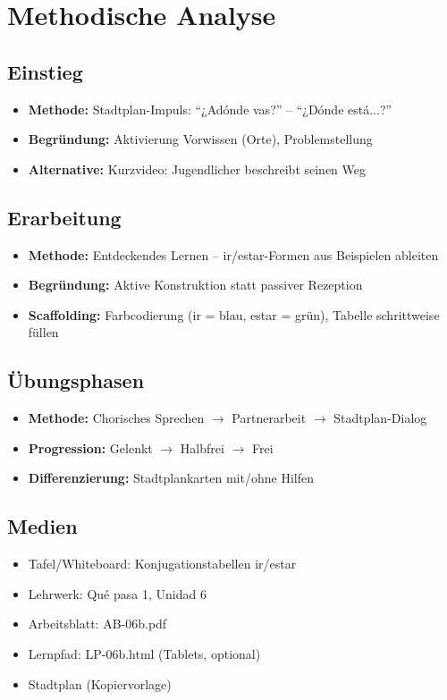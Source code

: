 \documentclass[11pt,a4paper]{article}
\newcommand{\lehrwerk}{Qué pasa 1}
\newcommand{\lehrwerkseite}{Unidad 6}
\begin{document}
\section{Methodische Analyse}

\subsection{Einstieg}
\begin{itemize}
    \item \textbf{Methode:} Stadtplan-Impuls: ``¿Adónde vas?'' -- ``¿Dónde está...?''
    \item \textbf{Begründung:} Aktivierung Vorwissen (Orte), Problemstellung
    \item \textbf{Alternative:} Kurzvideo: Jugendlicher beschreibt seinen Weg
\end{itemize}

\subsection{Erarbeitung}
\begin{itemize}
    \item \textbf{Methode:} Entdeckendes Lernen -- ir/estar-Formen aus Beispielen ableiten
    \item \textbf{Begründung:} Aktive Konstruktion statt passiver Rezeption
    \item \textbf{Scaffolding:} Farbcodierung (ir = blau, estar = grün), Tabelle schrittweise füllen
\end{itemize}

\subsection{Übungsphasen}
\begin{itemize}
    \item \textbf{Methode:} Chorisches Sprechen $\rightarrow$ Partnerarbeit $\rightarrow$ Stadtplan-Dialog
    \item \textbf{Progression:} Gelenkt $\rightarrow$ Halbfrei $\rightarrow$ Frei
    \item \textbf{Differenzierung:} Stadtplankarten mit/ohne Hilfen
\end{itemize}

\subsection{Medien}
\begin{itemize}
    \item Tafel/Whiteboard: Konjugationstabellen ir/estar
    \item Lehrwerk: \lehrwerk, \lehrwerkseite
    \item Arbeitsblatt: AB-06b.pdf
    \item Lernpfad: LP-06b.html (Tablets, optional)
    \item Stadtplan (Kopiervorlage)
\end{itemize}
\end{document}

